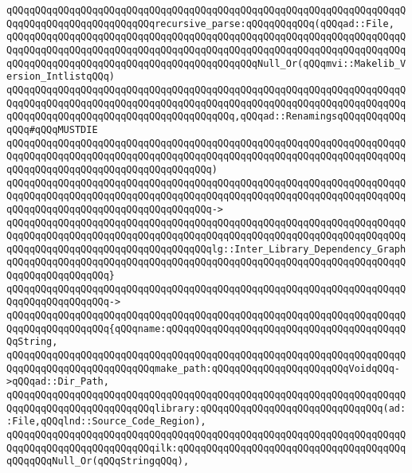 \verb|qQQqqQQqqQQqqQQqqQQqqQQqqQQqqQQqqQQqqQQqqQQqqQQqqQQqqQQqqQQqqQQqqQQqqQQqqQQqqQQqqQQqqQQqqQQqqQQqrecursive_parse:qQQqqQQqqQQq(qQQqad::File,|\newline
\verb|qQQqqQQqqQQqqQQqqQQqqQQqqQQqqQQqqQQqqQQqqQQqqQQqqQQqqQQqqQQqqQQqqQQqqQQqqQQqqQQqqQQqqQQqqQQqqQQqqQQqqQQqqQQqqQQqqQQqqQQqqQQqqQQqqQQqqQQqqQQqqQQqqQQqqQQqqQQqqQQqqQQqqQQqqQQqqQQqqQQqqQQqNull_Or(qQQqmvi::Makelib_Version_IntlistqQQq)|\newline
\verb|qQQqqQQqqQQqqQQqqQQqqQQqqQQqqQQqqQQqqQQqqQQqqQQqqQQqqQQqqQQqqQQqqQQqqQQqqQQqqQQqqQQqqQQqqQQqqQQqqQQqqQQqqQQqqQQqqQQqqQQqqQQqqQQqqQQqqQQqqQQqqQQqqQQqqQQqqQQqqQQqqQQqqQQqqQQqqQQqqQQq,qQQqad::RenamingsqQQqqQQqqQQqqQQq#qQQqMUSTDIE|\newline
\verb|qQQqqQQqqQQqqQQqqQQqqQQqqQQqqQQqqQQqqQQqqQQqqQQqqQQqqQQqqQQqqQQqqQQqqQQqqQQqqQQqqQQqqQQqqQQqqQQqqQQqqQQqqQQqqQQqqQQqqQQqqQQqqQQqqQQqqQQqqQQqqQQqqQQqqQQqqQQqqQQqqQQqqQQqqQQqqQQq)|\newline
\verb|qQQqqQQqqQQqqQQqqQQqqQQqqQQqqQQqqQQqqQQqqQQqqQQqqQQqqQQqqQQqqQQqqQQqqQQqqQQqqQQqqQQqqQQqqQQqqQQqqQQqqQQqqQQqqQQqqQQqqQQqqQQqqQQqqQQqqQQqqQQqqQQqqQQqqQQqqQQqqQQqqQQqqQQqqQQqqQQq->|\newline
\verb|qQQqqQQqqQQqqQQqqQQqqQQqqQQqqQQqqQQqqQQqqQQqqQQqqQQqqQQqqQQqqQQqqQQqqQQqqQQqqQQqqQQqqQQqqQQqqQQqqQQqqQQqqQQqqQQqqQQqqQQqqQQqqQQqqQQqqQQqqQQqqQQqqQQqqQQqqQQqqQQqqQQqqQQqqQQqqQQqlg::Inter_Library_Dependency_Graph|\newline
\verb|qQQqqQQqqQQqqQQqqQQqqQQqqQQqqQQqqQQqqQQqqQQqqQQqqQQqqQQqqQQqqQQqqQQqqQQqqQQqqQQqqQQqqQQq}|\newline
\verb|qQQqqQQqqQQqqQQqqQQqqQQqqQQqqQQqqQQqqQQqqQQqqQQqqQQqqQQqqQQqqQQqqQQqqQQqqQQqqQQqqQQqqQQq->|\newline
\verb|qQQqqQQqqQQqqQQqqQQqqQQqqQQqqQQqqQQqqQQqqQQqqQQqqQQqqQQqqQQqqQQqqQQqqQQqqQQqqQQqqQQqqQQq{qQQqname:qQQqqQQqqQQqqQQqqQQqqQQqqQQqqQQqqQQqqQQqqQQqString,|\newline
\verb|qQQqqQQqqQQqqQQqqQQqqQQqqQQqqQQqqQQqqQQqqQQqqQQqqQQqqQQqqQQqqQQqqQQqqQQqqQQqqQQqqQQqqQQqqQQqqQQqmake_path:qQQqqQQqqQQqqQQqqQQqqQQqVoidqQQq->qQQqad::Dir_Path,|\newline
\verb|qQQqqQQqqQQqqQQqqQQqqQQqqQQqqQQqqQQqqQQqqQQqqQQqqQQqqQQqqQQqqQQqqQQqqQQqqQQqqQQqqQQqqQQqqQQqqQQqlibrary:qQQqqQQqqQQqqQQqqQQqqQQqqQQqqQQq(ad::File,qQQqlnd::Source_Code_Region),|\newline
\verb|qQQqqQQqqQQqqQQqqQQqqQQqqQQqqQQqqQQqqQQqqQQqqQQqqQQqqQQqqQQqqQQqqQQqqQQqqQQqqQQqqQQqqQQqqQQqqQQqilk:qQQqqQQqqQQqqQQqqQQqqQQqqQQqqQQqqQQqqQQqqQQqqQQqNull_Or(qQQqStringqQQq),|\newline
